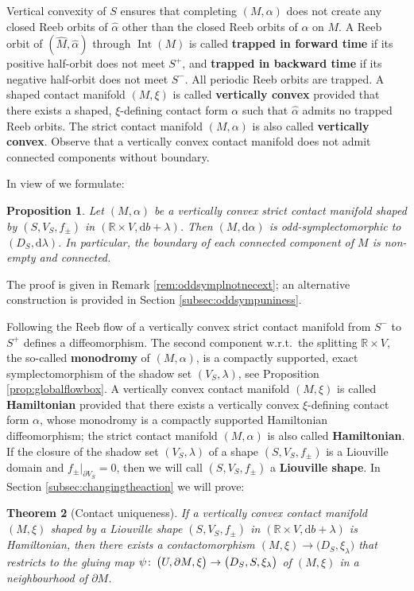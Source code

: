 \documentclass{amsart}
\newtheorem{prop}{Proposition}[subsection]
\newtheorem{thm}[prop]{Theorem}
\theoremstyle{definition}
\def\co{\colon\thinspace}
\newcommand{\rmd}{\mathrm d}
\newcommand{\R}{\mathbb R}
\newcommand{\ra}{\rightarrow}
\DeclareMathOperator{\Int}{\mathrm{Int}}
\begin{document}
Vertical convexity of $S$ ensures
that completing $(M,\alpha)$
does not create any closed Reeb orbits of $\hat{\alpha}$
other than the closed Reeb orbits of $\alpha$ on $M$.
A Reeb orbit of $(\hat{M},\hat{\alpha})$ through $\Int(M)$
is called {\bf trapped in forward time}
if its positive half-orbit does not meet $S^+$,
and {\bf trapped in backward time}
if its negative half-orbit does not meet $S^-$.
All periodic Reeb orbits are trapped.
A shaped contact manifold $(M,\xi)$
is called {\bf vertically convex}
provided that there exists a shaped, $\xi$-defining
contact form $\alpha$ such that
$\hat{\alpha}$ admits no trapped Reeb orbits.
The strict contact manifold $(M,\alpha)$
is also called {\bf vertically convex}.
Observe that a vertically convex contact manifold
does not admit connected components
without boundary.

In view of \cite[p.\ 1305, Item~1.a)]{eh94} we formulate:


\begin{prop}
 \label{prop:oddsymplnotnecext}
 Let $(M,\alpha)$ be a vertically convex strict contact manifold
 shaped by $(S,V_S,f_{\pm})$ in $(\R\times V,\rmd b+\lambda)$.
 Then $(M,\rmd\alpha)$ is odd-symplectomorphic
 to $(D_S,\rmd\lambda)$.
 In particular,
 the boundary of each connected component of $M$
 is non-empty and connected.
\end{prop}


The proof is given in Remark
\ref{rem:oddsymplnotnecext};
an alternative construction is provided in
Section \ref{subsec:oddsympuniness}.

Following the Reeb flow
of a vertically convex strict contact manifold
from $S^-$ to $S^+$ defines a diffeomorphism.
The second component w.r.t.\ the splitting $\R\times V$,
the so-called {\bf monodromy} of $(M,\alpha)$,
is a compactly supported,
exact symplectomorphism of the shadow set $(V_S,\lambda)$,
see Proposition \ref{prop:globalflowbox}.
A vertically convex contact manifold $(M,\xi)$
is called {\bf Hamiltonian} provided that there exists
a vertically convex $\xi$-defining contact form $\alpha$,
whose monodromy is a compactly supported
Hamiltonian diffeomorphism;
the strict contact manifold $(M,\alpha)$
is also called {\bf Hamiltonian}.
If the closure of the shadow set $(V_S,\lambda)$
of a shape $(S,V_S,f_{\pm})$ is a Liouville domain
and $f_{\pm}|_{\partial V_S}=0$,
then we will call $(S,V_S,f_{\pm})$ a {\bf Liouville shape}.
In Section \ref{subsec:changingtheaction} we will prove:


\begin{thm}[Contact uniqueness]
 \label{thm:monodromy}
 If a vertically convex contact manifold $(M,\xi)$
 shaped by a Liouville shape $(S,V_S,f_{\pm})$
 in $(\R\times V,\rmd b+\lambda)$ is Hamiltonian,
 then there exists a contactomorphism
 $(M,\xi)\ra\big(D_S,\xi_{\lambda}\big)$
 that restricts to the gluing map
 $\psi\co\big(U,\partial M,\xi\big)\ra\big(D_S,S,\xi_{\lambda}\big)$
 of $(M,\xi)$ in a neighbourhood of $\partial M$.
\end{thm}
\end{document}
